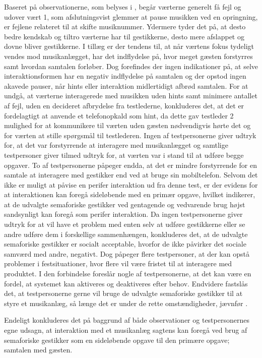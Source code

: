 Baseret på observationerne, som belyses i , begår værterne generelt få fejl og udover vært 1, som afslutningsvist glemmer at pause musikken ved en opringning, er fejlene relateret til at skifte musiknummer. Ydermere tyder det på, at desto bedre kendskab og tiltro værterne har til gestikkerne, desto mere afslappet og dovne bliver gestikkerne. I tillæg er der tendens til, at når værtens fokus tydeligt vendes mod musikanlægget, har det indflydelse på, hvor meget gæsten forstyrres samt hvordan samtalen forløber. Dog forefindes der ingen indikationer på, at selve interaktionsformen har en negativ indflydelse på samtalen og der opstod ingen akavede pauser, når hints eller interaktion midlertidigt afbrød samtalen. For at undgå, at værterne interagerede med musikken uden hints samt minimere antallet af fejl, uden en decideret afbrydelse fra testlederne, konkluderes det, at det er fordelagtigt at anvende et telefonopkald som hint, da dette gav testleder 2 mulighed for at kommunikere til værten uden gæsten nødvendigvis hørte det og for værten at stille spørgsmål til testlederen.\blankline
%
Ingen af testpersonerne giver udtryk for, at det var forstyrrende at interagere med musikanlægget og samtlige testpersoner giver tilmed udtryk for, at værten var i stand til at udføre begge opgaver. To af testpersonerne påpeger endda, at det er mindre forstyrrende for en samtale at interagere med gestikker end ved at bruge sin mobiltelefon. Selvom det ikke er muligt at påvise en perifer interaktion ud fra denne test, er der evidens for at interaktionen kan foregå sideløbende med en primær opgave, hvilket indikerer, at de udvalgte semaforiske gestikker ved gentagende og vedvarende brug højst sandsynligt kan foregå som perifer interaktion. \blankline
%
Da ingen testpersonerne giver udtryk for at vil have et problem med enten selv at udføre gestikkerne eller se andre udføre dem i forskellige sammenhængen, konkluderes det, at de udvalgte semaforiske gestikker er socialt acceptable, hvorfor de ikke påvirker det sociale samværd med andre, negativt. Dog påpeger flere testpersoner, at der kan opstå problemer i festsituationer, hvor flere vil være fristet til at interagere med produktet. I den forbindelse foreslår nogle af testpersonerne, at det kan være en fordel, at systemet kan aktiveres og deaktiveres efter behov. Endvidere fastslås det, at testpersonerne gerne vil bruge de udvalgte semaforiske gestikker til at styre et musikanlæg, så længe det er under de rette omstændigheder, jævnfør .  

Endeligt konkluderes det på baggrund af både observationer og testpersonernes egne udsagn, at interaktion med et musikanlæg sagtens kan foregå ved brug af semaforiske gestikker som en sideløbende opgave til den primære opgave; samtalen med gæsten.



